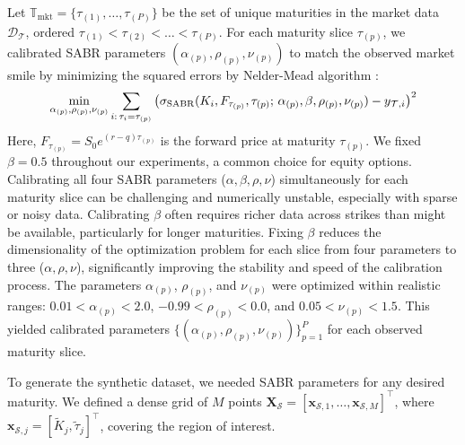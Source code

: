 \documentclass[preprint,12pt]{elsarticle}
\begin{document}
Let $ \mathbb{T}_\text{mkt}=\{\tau_{(1)}, \dots, \tau_{(P)}\}$ be the set of unique maturities in the market data $\mathcal{D}_\mathcal{T}$, ordered $ \tau_{(1)} < \tau_{(2)} < \dots < \tau_{(P)} $. For each maturity slice $\tau_{(p)}$, we calibrated SABR parameters $(\alpha_{(p)}, \rho_{(p)}, \nu_{(p)})$ to match the observed market smile by minimizing the squared errors by Nelder-Mead algorithm \citep{nelder1965simplex}:
\begin{equation}
\min_{\alpha_{(p)}, \rho_{(p)}, \nu_{(p)}} \sum_{i:\,\tau_i=\tau_{(p)}} \left( \sigma_{\rm SABR}(K_i, F_{\tau_{(p)}}, \tau_{(p)};\, \alpha_{(p)}, \beta,\rho_{(p)},\nu_{(p)}) - y_{\mathcal{T},i} \right)^2
\end{equation}
Here, $ F_{\tau_{(p)}}=S_0e^{(r-q)\tau_{(p)}}$ is the forward price at maturity $ \tau_{(p)} $. We fixed $\beta=0.5$ throughout our experiments, a common choice for equity options. Calibrating all four SABR parameters ($\alpha, \beta, \rho, \nu$) simultaneously for each maturity slice can be challenging and numerically unstable, especially with sparse or noisy data.  Calibrating $\beta$ often requires richer data across strikes than might be available, particularly for longer maturities. Fixing $\beta$ reduces the dimensionality of the optimization problem for each slice from four parameters to three ($\alpha, \rho, \nu$), significantly improving the stability and speed of the calibration process. The parameters $\alpha_{(p)}$, $\rho_{(p)}$, and $\nu_{(p)}$ were optimized within realistic ranges: $0.01 < \alpha_{(p)} < 2.0$, $-0.99 < \rho_{(p)} < 0.0$, and $0.05 < \nu_{(p)} < 1.5$. This yielded calibrated parameters $ \{ (\alpha_{(p)}, \rho_{(p)}, \nu_{(p)}) \}_{p=1}^P $ for each observed maturity slice.

To generate the synthetic dataset, we needed SABR parameters for any desired maturity. We defined a dense grid of $M$ points $\mathbf{X}_\mathcal{S}=[\mathbf{x}_{\mathcal{S},1},\dots, \mathbf{x}_{\mathcal{S},M}]^\intercal$, where $\mathbf{x}_{\mathcal{S},j} = [\tilde{K}_j, \tilde{\tau}_j]^\intercal$, covering the region of interest.
\end{document}
